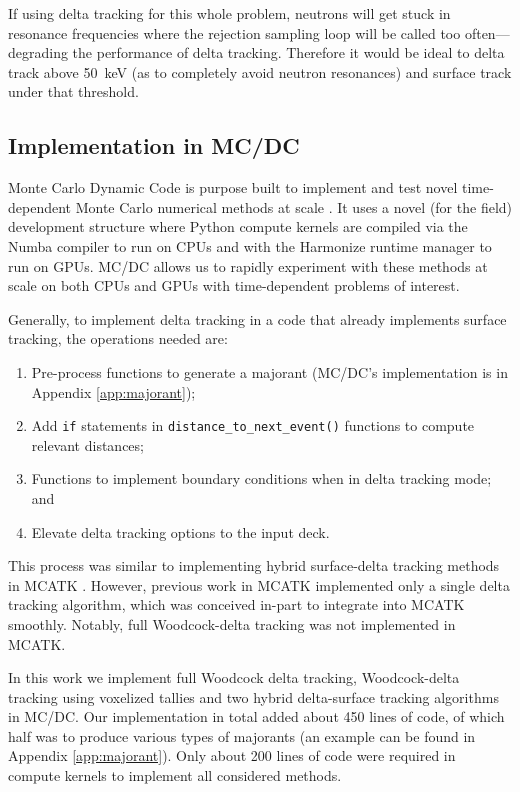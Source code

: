If using delta tracking for this whole problem, neutrons will get stuck in resonance frequencies where the rejection sampling loop will be called too often---degrading the performance of delta tracking.
Therefore it would be ideal to delta track above \SI{50}{\kilo\electronvolt} (as to completely avoid neutron resonances) and surface track under that threshold.

\subsection{Implementation in MC/DC}
\label{sec:implementation}

Monte Carlo Dynamic Code is purpose built to implement and test novel time-dependent Monte Carlo numerical methods at scale \cite{morgan_2025_monte, morgan_monte_2024}.
It uses a novel (for the field) development structure where Python compute kernels are compiled via the Numba compiler to run on CPUs and with the Harmonize runtime manager \cite{brax2023, cuneo_2025_harmonize} to run on GPUs.
MC/DC allows us to rapidly experiment with these methods at scale on both CPUs and GPUs with time-dependent problems of interest.

Generally, to implement delta tracking in a code that already implements surface tracking, the operations needed are:
\begin{enumerate}
    \item Pre-process functions to generate a majorant (MC/DC's implementation is in Appendix \ref{app:majorant});
    \item Add \texttt{if} statements in \texttt{distance\_to\_next\_event()} functions to compute relevant distances;
    \item Functions to implement boundary conditions when in delta tracking mode; and
    \item Elevate delta tracking options to the input deck.
\end{enumerate}
This process was similar to implementing hybrid surface-delta tracking methods in MCATK \cite{morgan2023delta}.
However, previous work in MCATK implemented only a single delta tracking algorithm, which was conceived in-part to integrate into MCATK smoothly.
Notably, full Woodcock-delta tracking was not implemented in MCATK.

In this work we implement full Woodcock delta tracking, Woodcock-delta tracking using voxelized tallies and two hybrid delta-surface tracking algorithms in MC/DC.
Our implementation in total added about \num{450} lines of code, of which half was to produce various types of majorants (an example can be found in Appendix \ref{app:majorant}). 
Only about \num{200} lines of code were required in compute kernels to implement all considered methods.

